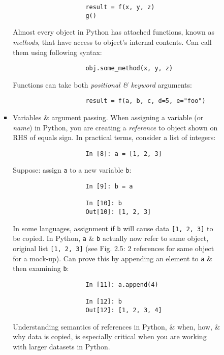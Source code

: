 \documentclass{article}
\begin{document}
\begin{itemize}
\begin{itemize}
\begin{itemize}
\begin{itemize}
				\begin{verbatim}
					result = f(x, y, z)
					g()
				\end{verbatim}
				Almost every object in Python has attached functions, known as {\it methods}, that have access to object's internal contents. Can call them using following syntax:
				\begin{verbatim}
					obj.some_method(x, y, z)
				\end{verbatim}
				Functions can take both {\it positional \& keyword} arguments:
				\begin{verbatim}
					result = f(a, b, c, d=5, e="foo")
				\end{verbatim}
				\item {\sf Variables \& argument passing.} When assigning a variable (or {\it name}) in Python, you are creating a {\it reference} to object shown on RHS of equals sign. In practical terms, consider a list of integers:
				\begin{verbatim}
					In [8]: a = [1, 2, 3]
				\end{verbatim}
				Suppose: assign {\tt a} to a new variable {\tt b}:
				\begin{verbatim}
					In [9]: b = a
					
					In [10]: b
					Out[10]: [1, 2, 3]
				\end{verbatim}
				In some languages, assignment if {\tt b} will cause data {\tt[1, 2, 3]} to be copied. In Python, {\tt a} \& {\tt b} actually now refer to same object, original list {\tt[1, 2, 3]} (see {\sf Fig. 2.5: 2 references for same object} for a mock-up). Can prove this by appending an element to {\tt a} \& then examining {\tt b}:
				\begin{verbatim}
					In [11]: a.append(4)
					
					In [12]: b
					Out[12]: [1, 2, 3, 4]
				\end{verbatim}
				Understanding semantics of references in Python, \& when, how, \& why data is copied, is especially critical when you are working with larger datasets in Python.
				

\end{itemize}
\end{itemize}
\end{itemize}
\end{itemize}
\end{document}
